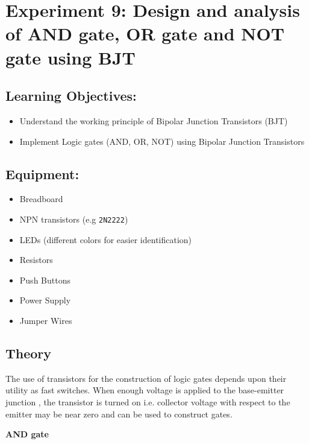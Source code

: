 \section*{Experiment 9: Design and analysis of AND gate, OR gate and NOT gate using BJT}  

\subsection*{Learning Objectives:}

\begin{itemize}
    \item Understand the working principle of Bipolar Junction Transistors (BJT)
    \item Implement Logic gates (AND, OR, NOT) using Bipolar Junction Transistors
\end{itemize}

\subsection*{Equipment:}

\begin{itemize}
    \item Breadboard
    \item NPN transistors (e.g \verb|2N2222|)
    \item LEDs (different colors for easier identification)
    \item Resistors 
    \item Push Buttons 
    \item Power Supply 
    \item Jumper Wires
\end{itemize}

\subsection*{Theory}

The use of transistors for the construction of logic gates depends upon their utility as fast switches. When enough voltage is applied to the base-emitter junction , the transistor is turned on i.e. collector voltage with respect to the emitter may be near zero and can be used to construct gates.

\vspace{0.25cm}

\noindent \textbf{AND gate}

